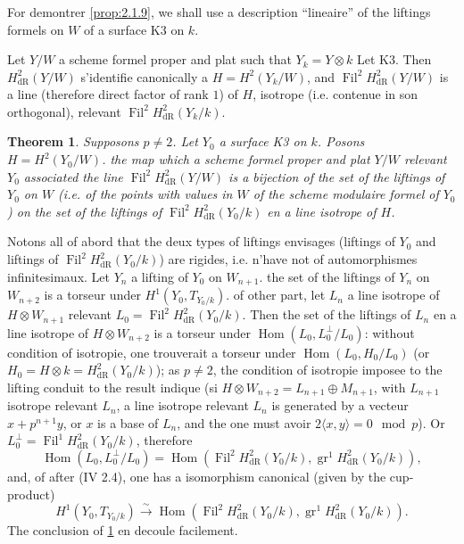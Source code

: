\documentclass[12pt,a4paper]{article}
\theoremstyle{plain}
\newtheorem{theorem}{Theorem}[section]
\theoremstyle{definition}
\theoremstyle{remark}
\DeclareMathOperator{\Fil}{Fil}
\DeclareMathOperator{\gr}{gr}
\DeclareMathOperator{\Hom}{Hom}
\providecommand{\Hom}{\operatorname{Hom}}
\begin{document}
\subsubsection{}
For demontrer \ref{prop:2.1.9}, we shall use a description ``lineaire'' of the liftings formels on $W$ of a surface K3 on $k$.

Let $Y/W$ a scheme formel proper and plat such that $Y_k = Y \otimes k$ Let K3. Then $H^2_\mathrm{dR}(Y/W)$ s'identifie canonically a $H = H^2(Y_k/W)$, and $\Fil^2 H^2_\mathrm{dR}(Y/W)$ is a line (therefore direct factor of rank $1$) of $H$, isotrope (i.e. contenue in son orthogonal), relevant $\Fil^2 H^2_\mathrm{dR}(Y_k/k)$.

\begin{theorem}\label{thm:2.1.11}
Supposons $p \neq 2$. Let $Y_0$ a surface K3 on $k$. Posons $H = H^2(Y_0/W)$. the map which a scheme formel proper and plat $Y/W$ relevant $Y_0$ associated the line $\Fil^2 H^2_\mathrm{dR}(Y/W)$ is a bijection of the set of the liftings of $Y_0$ on $W$ (i.e. of the points with values in $W$ of the scheme modulaire formel of $Y_0$) on the set of the liftings of $\Fil^2 H^2_\mathrm{dR}(Y_0/k)$ en a line isotrope of $H$.
\end{theorem}

Notons all of abord that the deux types of liftings envisages (liftings of $Y_0$ and liftings of $\Fil^2 H^2_\mathrm{dR}(Y_0/k)$) are rigides, i.e. n'have not of automorphismes infinitesimaux. Let $Y_n$ a lifting of $Y_0$ on $W_{n+1}$. the set of the liftings of $Y_n$ on $W_{n+2}$ is a torseur under $H^1(Y_0, T_{Y_0/k})$. of other part, let $L_n$ a line isotrope of $H \otimes W_{n+1}$ relevant $L_0 = \Fil^2 H^2_\mathrm{dR}(Y_0/k)$. Then the set of the liftings of $L_n$ en a line isotrope of $H \otimes W_{n+2}$ is a torseur under $\Hom(L_0, L_0^\perp/L_0)$: without condition of isotropie, one trouverait a torseur under $\Hom(L_0, H_0/L_0)$ (or $H_0 = H \otimes k = H^2_\mathrm{dR}(Y_0/k)$); as $p \neq 2$, the condition of isotropie imposee to the lifting conduit to the result indique (si $H \otimes W_{n+2} = L_{n+1} \oplus M_{n+1}$, with $L_{n+1}$ isotrope relevant $L_n$, a line isotrope relevant $L_n$ is generated by a vecteur $x + p^{n+1}y$, or $x$ is a base of $L_n$, and the one must avoir $2\langle x, y \rangle = 0 \mod p$). Or $L_0^\perp = \Fil^1 H^2_\mathrm{dR}(Y_0/k)$, therefore
\[
\Hom(L_0, L_0^\perp/L_0) = \Hom(\Fil^2 H^2_\mathrm{dR}(Y_0/k), \gr^1 H^2_\mathrm{dR}(Y_0/k)),
\]
and, of after (IV 2.4), one has a isomorphism canonical (given by the cup-product)
\[
H^1(Y_0, T_{Y_0/k}) \xrightarrow{\sim} \Hom(\Fil^2 H^2_\mathrm{dR}(Y_0/k), \gr^1 H^2_\mathrm{dR}(Y_0/k)).
\]
The conclusion of \ref{thm:2.1.11} en decoule facilement.
\end{document}
